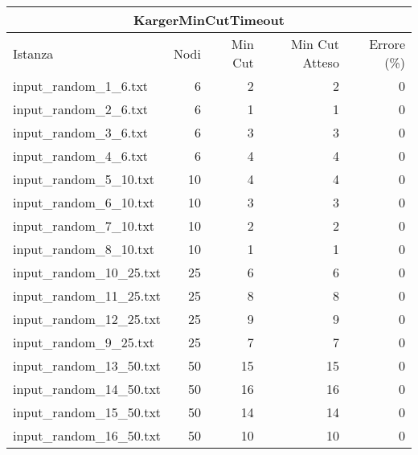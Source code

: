 \begin{table}[H]
    \centering

    \begin{tabular}{lrrrr}
     \hline
     \multicolumn{5}{c}{KargerMinCutTimeout} \\
     \hline
     Istanza                    &    Nodi &   Min Cut &     Min Cut Atteso &     Errore (\%) \\
     \hline
     input\_random\_1\_6.txt    &       6 &         2 &                  2 &           0     \\
     input\_random\_2\_6.txt    &       6 &         1 &                  1 &           0     \\
     input\_random\_3\_6.txt    &       6 &         3 &                  3 &           0     \\
     input\_random\_4\_6.txt    &       6 &         4 &                  4 &           0     \\
     input\_random\_5\_10.txt   &      10 &         4 &                  4 &           0     \\
     input\_random\_6\_10.txt   &      10 &         3 &                  3 &           0     \\
     input\_random\_7\_10.txt   &      10 &         2 &                  2 &           0     \\
     input\_random\_8\_10.txt   &      10 &         1 &                  1 &           0     \\
     input\_random\_10\_25.txt  &      25 &         6 &                  6 &           0     \\
     input\_random\_11\_25.txt  &      25 &         8 &                  8 &           0     \\
     input\_random\_12\_25.txt  &      25 &         9 &                  9 &           0     \\
     input\_random\_9\_25.txt   &      25 &         7 &                  7 &           0     \\
     input\_random\_13\_50.txt  &      50 &        15 &                 15 &           0     \\
     input\_random\_14\_50.txt  &      50 &        16 &                 16 &           0     \\
     input\_random\_15\_50.txt  &      50 &        14 &                 14 &           0     \\
     input\_random\_16\_50.txt  &      50 &        10 &                 10 &           0     \\

\end{tabular}
\end{table}
